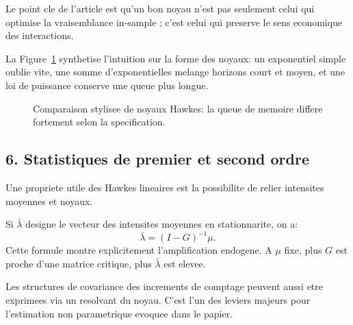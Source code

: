 \documentclass[11pt,a4paper]{article}
\begin{document}
Le point cle de l'article est qu'un bon noyau n'est pas seulement celui qui optimise la vraisemblance in-sample ; c'est celui qui preserve le sens economique des interactions.

La Figure~\ref{fig:kernels_compare} synthetise l'intuition sur la forme des noyaux: un exponentiel simple oublie vite, une somme d'exponentielles melange horizons court et moyen, et une loi de puissance conserve une queue plus longue.

\begin{figure}[H]
\centering
{}
\caption{Comparaison stylisee de noyaux Hawkes: la queue de memoire differe fortement selon la specification.}
\label{fig:kernels_compare}
\end{figure}

\subsection*{6. Statistiques de premier et second ordre}

Une propriete utile des Hawkes lineaires est la possibilite de relier intensites moyennes et noyaux.

Si $\bar{\lambda}$ designe le vecteur des intensites moyennes en stationnarite, on a:
\[
\bar{\lambda}=(I-G)^{-1}\mu.
\]
Cette formule montre explicitement l'amplification endogene. A $\mu$ fixe, plus $G$ est proche d'une matrice critique, plus $\bar{\lambda}$ est elevee.

Les structures de covariance des increments de comptage peuvent aussi etre exprimees via un resolvant du noyau. C'est l'un des leviers majeurs pour l'estimation non parametrique evoquee dans le papier.
\end{document}
